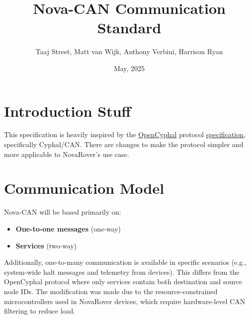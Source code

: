 \documentclass[a4paper,12pt]{article}
\title{Nova-CAN Communication Standard}
\author{Taaj Street, Matt van Wijk, Anthony Verbini, Harrison Ryan}
\date{May, 2025}
\begin{document}
\maketitle
\tableofcontents
\newpage

\section{Introduction Stuff}
This specification is heavily inspired by the \href{https://opencyphal.org/}{OpenCyphal} 
protocol \href{https://opencyphal.org/specification/Cyphal_Specification.pdf}{specification}, specifically Cyphal/CAN. 
There are changes to make the protocol simpler and more applicable to NovaRover's use case.

\section{Communication Model}
Nova-CAN will be based primarily on:
\begin{itemize}
    \item \textbf{One-to-one messages} (one-way)
    \item \textbf{Services} (two-way)
\end{itemize}

Additionally, one-to-many communication is available in specific scenarios (e.g., system-wide halt messages and telemetry from devices). 
This differs from the OpenCyphal protocol where only services contain both destination and source node IDs. The modification was made 
due to the resource-constrained microcontrollers used in NovaRover devices, which require hardware-level CAN filtering to reduce load.
\end{document}

